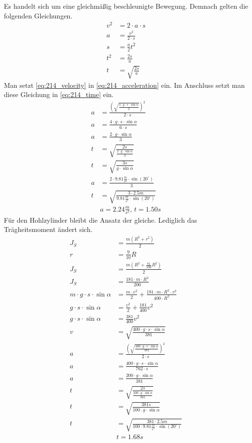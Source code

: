 Es handelt sich um eine gleichmäßig beschleunigte Bewegung. Demnach gelten die folgenden Gleichungen.
\begin{align}
    v^2&=2\cdot a\cdot s	\nonumber\\
    a&=\frac{v^2}{2\cdot s}	\label{eq:214_acceleration}\\
    s&=\frac{a}{2}t^2		\nonumber\\
    t^2&=\frac{2s}{a}		\nonumber\\
    t&=\sqrt{\frac{2s}{a}}	\label{eq:214_time}
\end{align}
Man setzt \eqref{eq:214_velocity} in \eqref{eq:214_acceleration} ein. Im Anschluss setzt man diese Gleichung in \eqref{eq:214_time} ein.
\begin{align*}
    a&=\frac{\left(\sqrt{\frac{4\cdot g\cdot s\cdot\sin\alpha}{3}}\right)^2}{2\cdot s}\\
    a&=\frac{4\cdot g\cdot s\cdot\sin\alpha}{6\cdot s}\\
    a&=\frac{2\cdot g\cdot\sin\alpha}{3}\\
    t&=\sqrt{\frac{2s}{\frac{2\cdot g\cdot\sin\alpha}{3}}}\\
    t&=\sqrt{\frac{3s}{g\cdot\sin\alpha}}\\
    a&=\frac{2\cdot 9.81\frac{m}{s^2}\cdot\sin(20^\circ)}{3}\\
    t&=\sqrt{\frac{3\cdot2.5m}{9.81\frac{m}{s^2}\cdot\sin(20^\circ)}}\\
    &\boxed{a=2.24\frac{m}{s^2},\,t=1.50s}	\tag{b}	\label{eq:214_b}
\end{align*}
Für den Hohlzylinder bleibt die Ansatz der gleiche. Lediglich das Trägheitsmoment ändert sich.
\begin{align*}
    J_S&=\frac{m(R^2+r^2)}{2}\\
    r&=\frac{9}{10}R\\
    J_S&=\frac{m(R^2+\frac{81}{100}R^2)}{2}\\
    J_S&=\frac{181\cdot m\cdot R^2}{200}\\
    m\cdot g\cdot s\cdot\sin\alpha&=\frac{m\cdot v^2}{2}+\frac{181\cdot m\cdot R^2\cdot v^2}{400\cdot R^2}\\
    g\cdot s\cdot\sin\alpha&=\frac{v^2}{2}+\frac{181}{400}v^2\\
    g\cdot s\cdot\sin\alpha&=\frac{381}{400}v^2\\
    v&=\sqrt{\frac{400\cdot g\cdot s\cdot\sin\alpha}{381}}\\
    a&=\frac{\left(\sqrt{\frac{400\cdot g\cdot s\cdot\sin\alpha}{381}}\right)^2}{2\cdot s}\\
    a&=\frac{400\cdot g\cdot s\cdot\sin\alpha}{762\cdot s}\\
    a&=\frac{200\cdot g\cdot\sin\alpha}{381}\\
    t&=\sqrt{\frac{2s}{\frac{200\cdot g\cdot\sin\alpha}{381}}}\\
    t&=\sqrt{\frac{381s}{100\cdot g\cdot\sin\alpha}}\\
    t&=\sqrt{\frac{381\cdot2.5m}{100\cdot9.81\frac{m}{s^2}\cdot\sin(20^\circ)}}\\
    &\boxed{t=1.68s}	\tag{c}	\label{eq:214_c}
\end{align*}